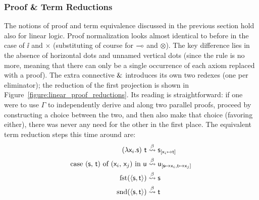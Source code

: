 \subsubsection{Proof \& Term Reductions}
The notions of proof and term equivalence discussed in the previous section hold also for linear logic.
Proof normalization looks almost identical to before in the case of $\ii$ and $\times$ (substituting of course for $\li$ and $\otimes$).
The key difference lies in the absence of horizontal dots and unnamed vertical dots (since the \Contraction{} rule is no more, meaning that there can only be a single occurrence of each axiom replaced with a proof).
The extra connective ${\&}$ introduces its own two redexes (one per eliminator); the reduction of the first projection is shown in Figure~\ref{figure:linear_proof_reductions}. 
Its reading is straightforward: if one were to use $\Gamma$ to independently derive  and  along two parallel proofs, proceed by constructing a choice between the two, and then also make that choice (favoring either), there was never any need for the other in the first place.
The equivalent term reduction steps this time around are:
\begin{align}
(\mathsf{\mathnormal{\lambda} \mathsf{x}_{\mathnormal{i}} .s})~\mathsf{t} & \overset{\beta}{\leadsto} \mathsf{s}_{[\mathsf{\mathsf{x}_{\mathnormal{i}} } \mapsto \mathsf{t}]}\\
\textrm{case (\ensuremath{\mathsf{s}}, \ensuremath{\mathsf{t}}) of (\ensuremath{\mathsf{\mathsf{x}_{\mathnormal{i}} }}, \ensuremath{\mathsf{\mathsf{x}_{\mathnormal{j}}}}) in \ensuremath{\mathsf{u}}} & \overset{\beta}{\leadsto} \mathsf{u_{[\mathsf{s} \mapsto \mathsf{\mathsf{x}_{\mathnormal{i}} }, \mathsf{t} \mapsto \mathsf{\mathsf{x}_{\mathnormal{j}}}]}}\\
\textrm{fst}(\langle\mathsf{s},\mathsf{t}\rangle) & \overset{\beta}{\leadsto} \mathsf{s}\\
\textrm{snd}(\langle\mathsf{s},\mathsf{t}\rangle) & \overset{\beta}{\leadsto} \mathsf{t}
\end{align}


